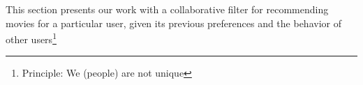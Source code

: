 This section presents our work with a collaborative filter for
recommending movies for a particular user, given its previous preferences
and the behavior of other users\footnote{Principle: We (people) are not unique}





